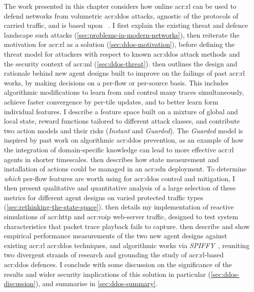The work presented in this chapter considers how online \gls{acr:rl} can be used to defend networks from volumetric \gls{acr:ddos} attacks, agnostic of the protocols of carried traffic, and is based upon ~\parencite{DBLP:journals/tnsm/SimpsonRP20}.
I first explain the existing threat and defence landscape such attacks (\cref{sec:problems-in-modern-networks}), then reiterate the motivation for \gls{acr:rl} as a solution (\cref{sec:ddos-motivation}), before defining the threat model for attackers with respect to known \gls{acr:ddos} attack methods and the security context of \gls{acr:ml} (\cref{sec:ddos-threat}).
 then outlines the design and rationale behind new agent designs built to improve on the failings of past \gls{acr:rl} works, by making decisions on a per-flow or per-source basis.
This includes algorithmic modifications to learn from and control many traces simultaneously, achieve faster convergence by per-tile updates, and to better learn form individual features.
I describe a feature space built on a mixture of global and local state, reward functions tailored to different attack classes, and contribute two action models and their risks (\emph{Instant} and \emph{Guarded}).
The \emph{Guarded} model is inspired by past work on algorithmic \gls{acr:ddos} prevention, as an example of how the integration of domain-specific knowledge can lead to more effective \gls{acr:rl} agents in shorter timescales.
 then describes how state measurement and installation of actions could be managed in an \gls{acr:sdn} deployment.
To determine \emph{which} per-flow features are worth using for \gls{acr:ddos} control and mitigation, I then present qualitative and quantitative analysis of a large selection of these metrics for different agent designs on varied protected traffic types (\cref{sec:rethinking-the-state-space}).
 then details my implementation of reactive simulations of \gls{acr:http} and \gls{acr:voip} web-server traffic, designed to test system characteristics that packet trace playback fails to capture.
 then describe and show empirical performance measurements of the two new agent designs against existing \gls{acr:rl} \gls{acr:ddos} techniques, and algorithmic works via \emph{SPIFFY}~\parencite{DBLP:conf/ndss/KangGS16}, reuniting two divergent strands of research and grounding the study of \gls{acr:rl}-based \gls{acr:ddos} defences.
I conclude with some discussion on the significance of the results and wider security implications of this solution in particular (\cref{sec:ddos-discussion}), and summarise in \cref{sec:ddos-summary}.

